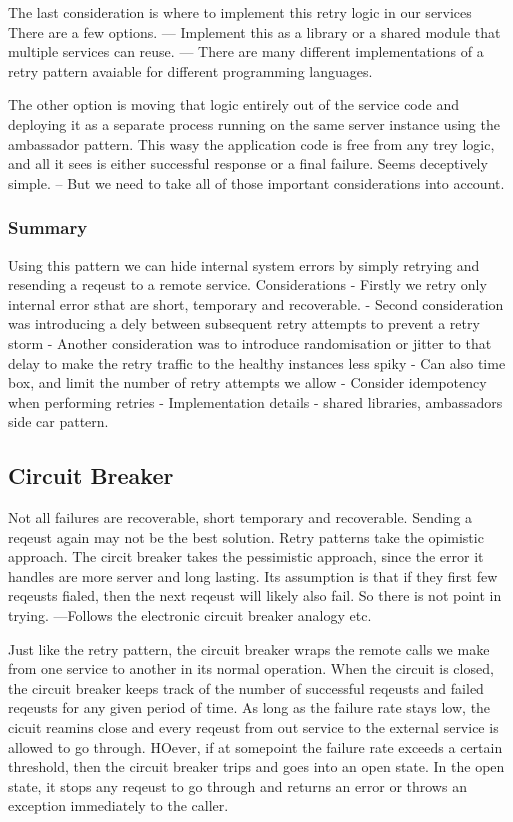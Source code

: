 \documentclass[a4paper, 11pt]{book}
\begin{document}
    The last consideration is where to implement this retry logic in our services
    There are a few options.
    --- Implement this as a library or a shared module that multiple services can reuse.
    --- There are many different implementations of a retry pattern avaiable for different programming languages.

    The other option is moving that logic entirely out of the service code and deploying it as a separate process running on the same server instance using the ambassador pattern.
    This wasy the application code is free from any trey logic, and all it sees is either successful response or a final failure.
    Seems deceptively simple.
    -- But we need to take all of those important considerations into account.

    \subsubsection{Summary}
    Using this pattern we can hide internal system errors by simply retrying and resending a reqeust to a remote service.
    Considerations
    - Firstly we retry only internal error sthat are short, temporary and recoverable.
    - Second consideration was introducing a dely between subsequent retry attempts to prevent a retry storm
    - Another consideration was to introduce randomisation or jitter to that delay to make the retry traffic to the healthy instances less spiky
    - Can also time box, and limit the number of retry attempts we allow
    - Consider idempotency when performing retries
    - Implementation details - shared libraries, ambassadors side car pattern.

    \subsection{Circuit Breaker}
    Not all failures are recoverable, short temporary and recoverable. Sending a reqeust again may not be the best solution.
    Retry patterns take the opimistic approach.
    The circit breaker takes the pessimistic approach, since the error it handles are more server and long lasting.
    Its assumption is that if they first few reqeusts fialed, then the next reqeust will likely also fail.
    So there is not point in trying.
    ---Follows the electronic circuit breaker analogy etc.

    Just like the retry pattern, the circuit breaker wraps the remote calls we make from one service to another in its normal operation.
    When the circuit is closed, the circuit breaker keeps track of the number of successful reqeusts and failed reqeusts for any given period of time.
    As long as the failure rate stays low, the cicuit reamins close and every reqeust from out service to the external service is allowed to go through.
    HOever, if at somepoint the failure rate exceeds a certain threshold, then the circuit breaker trips and goes into an open state.
    In the open state, it stops any reqeust to go through and returns an error or throws an exception immediately to the caller.
\end{document}
